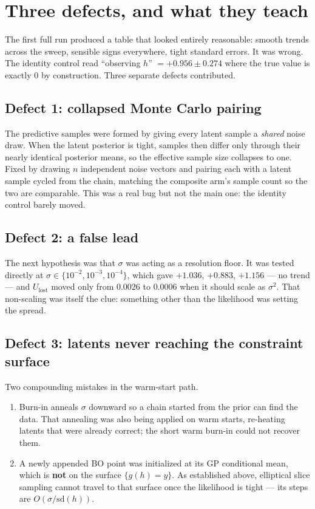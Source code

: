 \documentclass[11pt]{article}
\newcommand{\Ulost}{U_{\text{lost}}}
\begin{document}
\section{Three defects, and what they teach}
\label{sec:defects}

The first full run produced a table that looked entirely reasonable: smooth
trends across the sweep, sensible signs everywhere, tight standard errors. It
was wrong. The identity control read ``observing $h$'' $=+0.956\pm0.274$ where
the true value is exactly $0$ by construction. Three separate defects
contributed.

\subsection{Defect 1: collapsed Monte Carlo pairing}

The predictive samples were formed by giving every latent sample a
\emph{shared} noise draw. When the latent posterior is tight, samples then
differ only through their nearly identical posterior means, so the effective
sample size collapses to one. Fixed by drawing $n$ independent noise vectors and
pairing each with a latent sample cycled from the chain, matching the composite
arm's sample count so the two are comparable. This was a real bug but not the
main one: the identity control barely moved.

\subsection{Defect 2: a false lead}

The next hypothesis was that $\sigma$ was acting as a resolution floor. It was
tested directly at $\sigma\in\{10^{-2},10^{-3},10^{-4}\}$, which gave
$+1.036$, $+0.883$, $+1.156$ --- no trend --- and $\Ulost$ moved only from
$0.0026$ to $0.0006$ when it should scale as $\sigma^2$. That non-scaling was
itself the clue: something other than the likelihood was setting the spread.

\subsection{Defect 3: latents never reaching the constraint surface}

Two compounding mistakes in the warm-start path.

\begin{enumerate}
\item Burn-in anneals $\sigma$ downward so a chain started from the prior can
find the data. That annealing was also being applied on warm starts, re-heating
latents that were already correct; the short warm burn-in could not recover them.
\item A newly appended BO point was initialized at its GP conditional mean,
which is \textbf{not} on the surface $\{g(h)=y\}$. As established above,
elliptical slice sampling cannot travel to that surface once the likelihood is
tight --- its steps are $O(\sigma/\mathrm{sd}(h))$.
\end{enumerate}
\end{document}
